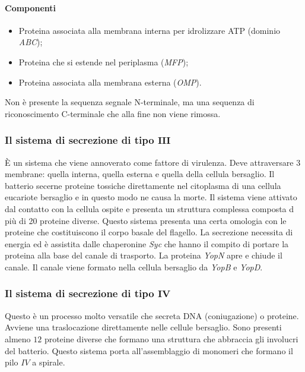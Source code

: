 			\paragraph{Componenti}
			\begin{multicols}{2}
				\begin{itemize}
					\item Proteina associata alla membrana interna per idrolizzare ATP (dominio \emph{ABC}); 
					\item Proteina che si estende nel periplasma (\emph{MFP}); 
					\item Proteina associata alla membrana esterna (\emph{OMP}).
				\end{itemize}
			\end{multicols}
			Non \`e presente la sequenza segnale N-terminale, ma una sequenza di riconoscimento C-terminale che alla fine non viene rimossa. 

			\subsubsection{Il sistema di secrezione di tipo $\mathbf{III}$}
			\`E un sistema che viene annoverato come fattore di virulenza.
			Deve attraversare 3 membrane: quella interna, quella esterna e quella della cellula bersaglio.
			Il batterio secerne proteine tossiche direttamente nel citoplasma di una cellula eucariote bersaglio e in questo modo ne causa la morte. 
			Il sistema viene attivato dal contatto con la cellula ospite e presenta un struttura complessa composta d pi\`u di 20 proteine diverse. 
			Questo sistema presenta una certa omologia con le proteine che costituiscono il corpo basale del flagello. 
			La secrezione necessita di energia ed \`e assistita dalle chaperonine \emph{Syc} che hanno il compito di portare la proteina alla base del canale di trasporto. 
			La proteina \emph{YopN} apre e chiude il canale.
			Il canale viene formato nella cellula bersaglio da \emph{YopB} e \emph{YopD}.

			\subsubsection{Il sistema di secrezione di tipo $\mathbf{IV}$}
			Questo \`e un processo molto versatile che secreta DNA (coniugazione) o proteine. 
			Avviene una traslocazione direttamente nelle cellule bersaglio. 
			Sono presenti almeno $12$ proteine diverse che formano una struttura che abbraccia gli involucri del batterio. 
			Questo sistema porta all'assemblaggio di monomeri che formano il pilo $IV$ a spirale. 

